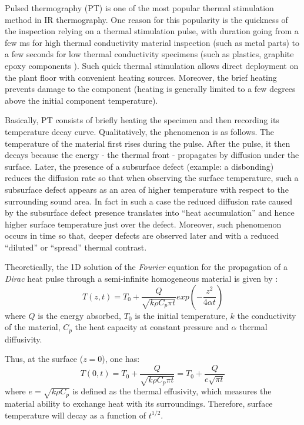 Pulsed thermography (PT) is one of the most popular thermal stimulation method in IR thermography. One reason for this popularity is the quickness of the inspection relying on a thermal stimulation pulse, with duration going from a few ms for high thermal conductivity material inspection (such as metal parts) to a few seconds for low thermal conductivity specimens (such as plastics, graphite epoxy components \citep{Maldague1993Nondestructive,Maldague1994bInfra}). Such quick thermal stimulation allows direct deployment on the plant floor with convenient heating sources. Moreover, the brief heating prevents damage to the component (heating is generally limited to a few degrees above the initial component temperature).

Basically, PT consists of briefly heating the specimen and then recording its temperature decay curve. Qualitatively, the phenomenon is as follows. The temperature of the material first rises during the pulse. After the pulse, it then decays because the energy - the thermal front - propagates by diffusion under the surface. Later, the presence of a subsurface defect (example: a disbonding) reduces the diffusion rate so that when observing the surface temperature, such a subsurface defect appears as an area of higher temperature with respect to the surrounding sound area. In fact in such a case the reduced diffusion rate caused by the subsurface defect presence translates into “heat accumulation” and hence higher surface temperature just over the defect. Moreover, such phenomenon occurs in time so that, deeper defects are observed later and with a reduced “diluted” or “spread” thermal contrast.

Theoretically, the 1D solution of the \textit{Fourier} equation for the propagation of a \textit{Dirac} heat pulse through a semi-infinite homogeneous material is given by \citep{carslaw1986heat}:
\begin{equation}
T(z,t) = T_0 + \frac{Q}{\sqrt{k\rho C_p \pi t}}exp(-\frac{z^2}{4\alpha t})
\end{equation}
where $Q$ is the energy absorbed, $T_0$  is the initial temperature, $k$ the conductivity of the material, $C_p$ the heat capacity at constant pressure and $\alpha$ thermal diffusivity.

Thus, at the surface ($z=0$), one has:
\begin{equation}
T(0,t) = T_0 + \frac{Q}{\sqrt{k\rho C_p \pi t}}=T_0 + \frac{Q}{e\sqrt{\pi t}}
\label{PT_eq}
\end{equation}
where $e=\sqrt{k\rho C_p}$ is defined as the thermal effusivity, which measures the material ability to exchange heat with its surroundings. Therefore, surface temperature will decay as a function of $t^{1/2}$.

